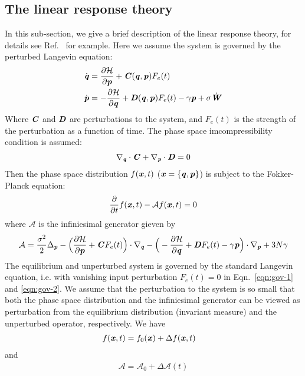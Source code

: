 \documentclass[aip,jcp,a4paper,reprint,onecolumn]{revtex4-1}
\newcommand{\vect}[1]{\textbf{\textit{#1}}}
\newcommand{\mh}{\mathcal H}
\newcommand{\fwg}{{\mathcal A}}
\begin{document}
\subsection{The linear response theory}
In this sub-section, we give a brief description of the linear response
theory, for details see Ref.~\cite{tuckeman2010statistical} for
example. Here we assume the system is governed by the
perturbed Langevin equation:
\begin{align}\label{eqn:gov-1}
  \dot{\vect q} & = \frac{\partial\mh}{\partial \vect p}
  + \vect C(\vect q,\vect p) F_e(t)\\\label{eqn:gov-2}
  \dot{\vect p} & =- \frac{\partial\mh}{\partial \vect q}
  + \vect D(\vect q,\vect p) F_e(t)
  - \gamma\vect p
  + \sigma\dot{\vect W}
\end{align}
Where $\vect C$ and $\vect D$ are perturbations to the system, and
$F_e(t)$ is the strength of the perturbation as a function of time.
The phase space imcompressibility condition is assumed:
\begin{align}
  \nabla_{\vect q}\cdot\vect C + \nabla_{\vect p}\cdot\vect D = 0
\end{align}
Then the phase space distribution $f(\vect x, t)$ ($\vect x = \{\vect
q, \vect p\}$) is subject to the Fokker-Planck equation:
\begin{align}
  \frac{\partial}{\partial t} f(\vect x, t) - \fwg f(\vect x, t) = 0
\end{align}
where $\fwg$ is the infiniesimal generator gieven by
\begin{align}
  \fwg =
  \frac{\sigma^2}2\Delta_{\vect p}
  - \Big(
  \frac{\partial \mh}{\partial\vect p} + \vect C F_e(t)
  \Big)\cdot\nabla_{\vect q}
  - \Big(
  -\frac{\partial \mh}{\partial\vect q} +
  \vect D F_e(t) - \gamma\vect p
  \Big)\cdot\nabla_{\vect p}
  + 3N\gamma
\end{align}
The equilibrium and unperturbed system
is governed by
the standard Langevin equation, i.e. with
vanishing input perturbation $F_e(t) = 0$ in
Eqn.~\eqref{eqn:gov-1} and \eqref{eqn:gov-2}.
We assume that the perturbation to the
system is so small that both the phase space distribution and the
infiniesimal generator can be viewed as perturbation from the equilibrium
distribution (invariant measure) and the unperturbed operator,
respectively. We have
\begin{align}
  f(\vect x, t) &= f_0(\vect x) + \Delta  f(\vect x, t)
\end{align}
and 
\begin{align}
  \fwg = \fwg_0 + \Delta\fwg(t)
\end{align}
\end{document}
